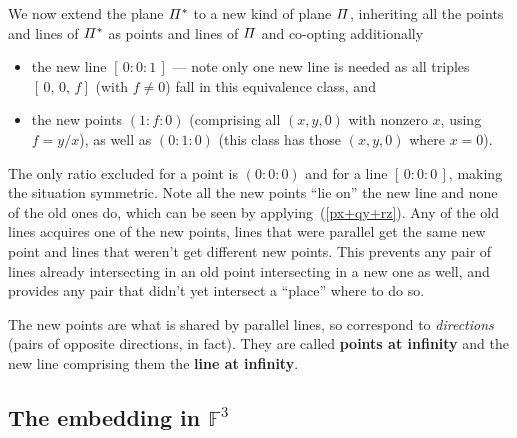 \documentclass[12pt]{article}
\def\comma{,\,\allowbreak}
\def\Fset{\mathbb{F}}
\begin{document}
We now extend the plane $\mit\Pi^*$ to a new kind of plane $\mit\Pi$,
inheriting all the points and lines of $\mit\Pi^*$ as {\sc point}s and {\sc line}s of
$\mit\Pi$ and co-opting additionally
%
\begin{itemize}

\item the new {\sc line} $[\,0 : 0 : 1\,]$ --- note only one new {\sc line} is
      needed as all triples $[\,0\comma 0\comma f]$ (with $f\ne0$)
      fall in this equivalence class, and

\item the new {\sc point}s $(1 : f : 0)$ (comprising all $(x,y,0)$ with nonzero $x$,
      using $f=y/x$), as well as $(0 : 1 : 0)$ (this class has those $(x,y,0)$
      where $x=0$).

\end{itemize}
%
The only ratio excluded for a {\sc point} is $(0:0:0)$ and for a {\sc line} $[\,0:0:0\,]$,
making the situation symmetric. Note all the new {\sc point}s ``lie on'' the new
{\sc line} and none of the old ones do, which can be seen by applying~(\ref{px+qy+rz}).
Any of the old {\sc line}s acquires one of the new {\sc point}s, {\sc line}s that were parallel
get the same new {\sc point} and {\sc line}s that weren't get different new {\sc point}s. This
prevents any pair of {\sc line}s already intersecting in an old {\sc point} intersecting in
a new one as well, and provides any pair that didn't yet intersect a ``place''
where to do so.

The new {\sc point}s are what is shared by parallel lines, so correspond to
{\em directions\/} (pairs of opposite directions, in fact). They are
called {\bf points at infinity} and the new {\sc line} comprising them the
{\bf line at infinity}.

\clearpage
\subsection*{The embedding in $\Fset^3$}
\end{document}
